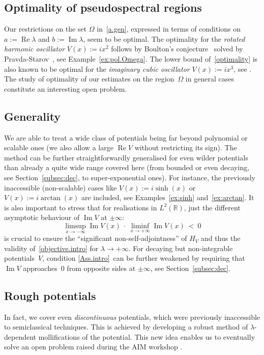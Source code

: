 {\subsection*{Optimality of pseudospectral regions}
Our restrictions on the set $\Omega$ in~\eqref{a.gen}, 
expressed in terms of conditions on $a:={\operatorname{Re}}\lambda$ and $b:={\operatorname{Im}}\lambda$,
seem to be optimal.
The optimality for the \emph{rotated harmonic oscillator} $V(x):=ix^2$ 
follows by Boulton's conjecture~\cite{Boulton_2002}
solved by Pravda-Starov~\cite{Pravda-Starov_2006},
see Example~\ref{ex:pol.Omega}. 
The lower bound of~\eqref{optimality} is also known to be optimal 
for the \emph{imaginary cubic oscillator} $V(x):=ix^3$, 
see \cite[{Sec.~4.1}]{BordeauxMontrieux-2013}.
The study of optimality of our estimates on the region~$\Omega$
in general cases constitute an interesting open problem.}
 
\subsection*{Generality}
We are able to treat a wide class of potentials being far beyond polynomial or scalable ones (we also allow a large ${\operatorname{Re}} V$ without restricting its sign). The method can be further straightforwardly generalised for even wilder potentials than already a quite wide range covered here 
(from bounded or even decaying, see Section~\ref{subsec:dec}, to super-exponential ones). 
For instance, the previously inaccessible (non-scalable) cases like 
$V(x):=i \sinh(x)$ or $V(x):=i \arctan(x)$ are included, 
see Examples~\ref{ex:sinh} and~\ref{ex:arctan}. 
It is also important to stress that 
for realisations in $L^2({\mathbb{R}})$, 
just the different asymptotic
behaviour of ${\operatorname{Im}} V$ at $\pm \infty$:
\begin{equation}\label{Ass.intro}
\limsup_{x\to -\infty} {\operatorname{Im}} V(x) 
\ \cdot \
\liminf_{x\to +\infty} {\operatorname{Im}} V(x) 
\ < \ 0
\end{equation}
is crucial to ensure the ``significant non-self-adjointness'' of $H_V$ 
and thus the validity of~\eqref{objective.intro} for $\lambda \to + \infty$. 
For decaying but non-integrable potentials~$V$, condition
\eqref{Ass.intro}~can be further weakened 
by requiring that~${\operatorname{Im}} V$ approaches~$0$ 
from opposite sides at $\pm \infty$, 
see Section~\ref{subsec:dec}. 

\subsection*{Rough potentials}
In fact, we cover even \emph{discontinuous} potentials, 
which were previously inaccessible to semiclassical techniques.
This is achieved by developing
a robust method of $\lambda$-dependent mollifications
of the potential. This new idea enables us to eventually
solve an open problem raised during the AIM workshop \cite[Open Problem~10.1]{AIM-2015}.

